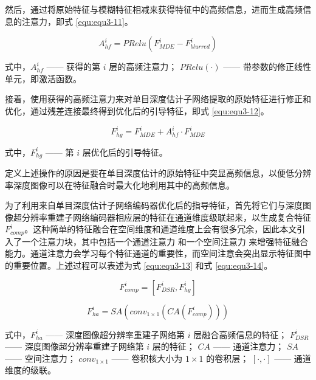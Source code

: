 然后，通过将原始特征与模糊特征相减来获得特征中的高频信息，进而生成高频信息的注意力，即式 \ref{equ:equ3-11}。

\begin{equation}
	A_{hf}^i=PRelu\left(F_{MDE}^i-F_{blurred}^i\right)
	\label{equ:equ3-11}
\end{equation}

\noindent 式中，$A_{hf}^i$ —— 获得的第 $i$ 层的高频注意力；\newline
\indent\quad $PRelu\left(\cdot\right)$ —— 带参数的修正线性单元，即激活函数。

接着，使用获得的高频注意力来对单目深度估计子网络提取的原始特征进行修正和优化，通过残差连接最终得到优化后的引导特征，即式 \ref{equ:equ3-12}。

\begin{equation}
	F_{hg}^i=F_{MDE}^i+A_{hf}^i\cdot F_{MDE}^i
	\label{equ:equ3-12}
\end{equation}

\noindent 式中，$F_{hg}^i$ —— 第 $i$ 层优化后的引导特征。

定义上述操作的原因是要在单目深度估计的原始特征中突显高频信息，以便低分辨率深度图像可以在特征融合时最大化地利用其中的高频信息。

为了利用来自单目深度估计子网络编码器优化后的指导特征，首先将它们与深度图像超分辨率重建子网络编码器相应层的特征在通道维度级联起来，以生成复合特征 $F_{comp}^i$。这种简单的特征融合在空间维度和通道维度上会有很多冗余，因此本文引入了一个注意力块，其中包括一个通道注意力 \cite{DBLP:conf/eccv/WooPLK18} 和一个空间注意力 \cite{DBLP:conf/eccv/WooPLK18} 来增强特征融合能力。通道注意力会学习每个特征通道的重要性，而空间注意会突出显示特征图中的重要位置。上述过程可以表述为式 \ref{equ:equ3-13} 和式 \ref{equ:equ3-14}。

\begin{equation}
	F_{comp}^i=\left[F_{DSR}^i,F_{hg}^i\right]
	\label{equ:equ3-13}
\end{equation}

\begin{equation}
	F_{ha}^i=SA\left(conv_{1\times1}\left(CA\left(F_{comp}^i\right)\right)\right)
	\label{equ:equ3-14}
\end{equation}

\noindent 式中，$F_{ha}^i$ —— 深度图像超分辨率重建子网络第 $i$ 层融合高频信息的特征；\newline
\indent\quad $F_{DSR}^i$ —— 深度图像超分辨率重建子网络第 $i$ 层的特征；\newline
\indent\quad $CA$ —— 通道注意力；\newline
\indent\quad $SA$ —— 空间注意力；\newline
\indent\quad $conv_{1\times1}$ —— 卷积核大小为 $1\times 1$ 的卷积层；\newline
\indent\quad $\left[\cdot,\cdot\right]$ —— 通道维度的级联。


